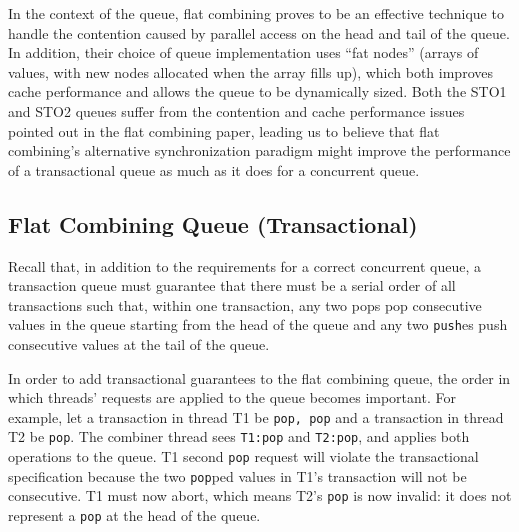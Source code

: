 In the context of the queue, flat combining proves to be an effective technique to handle the contention caused by parallel access on the head and tail of the queue. In addition, their choice of queue implementation uses ``fat nodes'' (arrays of values, with new nodes allocated when the array fills up), which both improves cache performance and allows the queue to be dynamically sized. Both the STO1 and STO2 queues suffer from the contention and cache performance issues pointed out in the flat combining paper, leading us to believe that flat combining's alternative synchronization paradigm might improve the performance of a transactional queue as much as it does for a concurrent queue.

\subsection{Flat Combining Queue (Transactional)}
%

Recall that, in addition to the requirements for a correct concurrent queue, a transaction queue must guarantee that there must be a serial order of all transactions such that, within one transaction, any two pops pop consecutive values in the queue starting from the head of the queue and any two \texttt{push}es push consecutive values at the tail of the queue.

In order to add transactional guarantees to the flat combining queue, the order in which threads' requests are applied to the queue becomes important. For example, let a transaction in thread T1 be \texttt{pop, pop} and a transaction in thread T2 be \texttt{pop}. The combiner thread sees \texttt{T1:pop} and \texttt{T2:pop}, and applies both operations to the queue. T1 second \texttt{pop} request will violate the transactional specification because the two \texttt{pop}ped values in T1's transaction will not be consecutive. T1 must now abort, which means T2's \texttt{pop} is now invalid: it does not represent a \texttt{pop} at the head of the queue.

